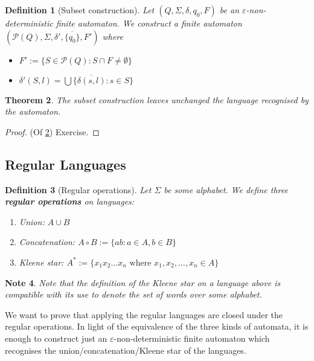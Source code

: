 \documentclass{article}
\theoremstyle{break}
\newtheorem{theorem}{Theorem}[section]
\newtheorem{definition}[theorem]{Definition}
\newtheorem{note}[theorem]{Note}
\begin{document}
\begin{definition}[Subset construction]
\label{def:ep-subset-construction}
  Let $(Q,\Sigma,\delta,q_0,F)$ be an $\varepsilon$-non-deterministic finite automaton. 
  We construct a finite automaton $(\mathcal{P}(Q), \Sigma, \delta', \overline{\{q_0\}}, F')$ where
  \begin{itemize}
    \item $F' := \{S\in \mathcal{P}(Q): S\cap F \neq \emptyset\}$
    \item $\delta'(S, l) = \bigcup \{\overline{\delta(s,l)}: s\in S\}$
  \end{itemize}
\end{definition}

\begin{theorem}
\label{thm:ep-subset-construction}
The subset construction leaves unchanged the language recognised by the automaton.
\end{theorem}

\begin{proof}(Of \ref{thm:ep-subset-construction})
  Exercise.
\end{proof}


\subsection{Regular Languages}

\begin{definition}[Regular operations]
\label{def:regular-operation}
Let $\Sigma$ be some alphabet. 
We define three \textbf{regular operations} on languages:
\begin{enumerate}
  \item Union: $A \cup B$
  \item Concatenation: $A \circ B := \{ab: a\in A, b\in B\}$
  \item Kleene star: $A^* :=\{x_1x_2\ldots x_n \text{ where } x_1,x_2,\ldots,x_n\in A\}$
\end{enumerate}
\end{definition}

\begin{note}
\label{note:Kleene-star-compatible}
Note that the definition of the Kleene star on a language above is compatible with its use to denote the set of words over some alphabet.
\end{note}

We want to prove that applying the regular languages are closed under the regular operations.
In light of the equivalence of the three kinds of automata, it is enough to construct just an $\varepsilon$-non-deterministic finite automaton which recognises the union/concatenation/Kleene star of the languages.
\end{document}
